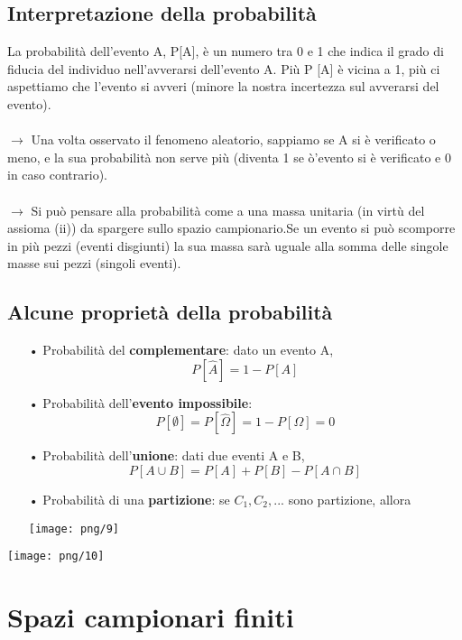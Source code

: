 \documentclass[12pt, letterpaper]{article}
\begin{document}
\subsection{Interpretazione della probabilità}

La probabilità dell’evento A, P[A], è un numero tra 0 e 1 che indica il grado di fiducia 
del individuo nell’avverarsi dell’evento A. Più P [A] è vicina a 1, più ci aspettiamo che 
l’evento si avveri (minore la nostra incertezza sul avverarsi del evento).
\\
\\
$\rightarrow$ Una volta osservato il fenomeno aleatorio, sappiamo se A si è verificato o meno, e la sua probabilità non serve più (diventa 1 se ò'evento si 
è verificato e 0 in caso contrario).\\
\\
$\rightarrow$ Si può pensare alla probabilità come a una massa unitaria (in virtù del assioma (ii)) da spargere sullo spazio campionario.Se un evento si può scomporre in più pezzi (eventi disgiunti) la sua massa sarà uguale alla somma delle singole masse sui pezzi (singoli eventi).

\subsection{Alcune proprietà della probabilità}

\begin{itemize}
   \item[•] Probabilità del \textbf{complementare}: dato un evento A,
      $$P[\hat{A}] = 1 - P[A]$$
   \item[•] Probabilità dell'\textbf{evento impossibile}:
      $$P[\emptyset] = P[\hat{\Omega}] = 1 - P[\Omega] = 0$$
   \item[•] Probabilità dell'\textbf{unione}: dati due eventi A e B,
      $$P[A \cup B] = P[A] + P[B] - P[A \cap B]$$
   \item[•] Probabilità di una \textbf{partizione}: se $C_1, C_2,...$ sono partizione, allora 

      \begin{center}\texttt{[image: png/9]}\end{center}
\end{itemize}
\texttt{[image: png/10]}

\section{Spazi campionari finiti}
\end{document}
